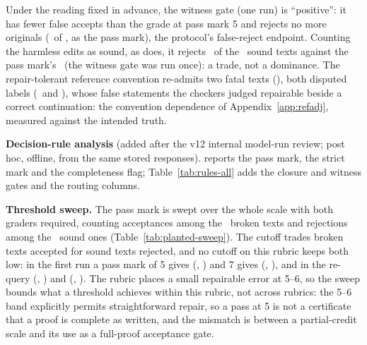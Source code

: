 Under the reading fixed in advance, the witness gate (one run) is ``positive'': it has fewer false accepts than the grade at pass mark 5 and rejects no more originals (\CRWitnessORejP\ of \CRNPerClass, as the pass mark), the protocol's false-reject endpoint. Counting the harmless edits as sound, as  does, it rejects \CRWitnessSoundRejP\ of the \CRNSound\ sound texts against the pass mark's \CRPassSoundRejP\ (the witness gate was run once): a trade, not a dominance. The repair-tolerant reference convention re-admits two fatal texts (\PLANTFAREFADJWIT), both disputed labels (\CRIdKimiPoneF\ and \CRIdGptPfiveF), whose false statements the checkers judged repairable beside a correct continuation: the convention dependence of Appendix~\ref{app:refadj}, measured against the intended truth.

\textbf{Decision-rule analysis} (added after the v12 internal model-run review; post hoc, offline, from the same stored responses).  reports the pass mark, the strict mark and the completeness flag; Table~\ref{tab:rules-all} adds the closure and witness gates and the routing columns.

\textbf{Threshold sweep.} The pass mark is swept over the whole scale with both graders required, counting acceptances among the \CRNBroken\ broken texts and rejections among the \CRNSound\ sound ones (Table~\ref{tab:planted-sweep}). The cutoff trades broken texts accepted for sound texts rejected, and no cutoff on this rubric keeps both low: in the first run a pass mark of 5 gives (\CRSweepFiveBrokenP, \CRSweepFiveSoundP) and 7 gives (\CRSweepSevenBrokenP, \CRSweepSevenSoundP), and in the re-query (\CRSweepFiveBrokenR, \CRSweepFiveSoundR) and (\CRSweepSevenBrokenR, \CRSweepSevenSoundR). The rubric places a small repairable error at 5--6, so the sweep bounds what a threshold achieves within this rubric, not across rubrics: the 5--6 band explicitly permits straightforward repair, so a pass at 5 is not a certificate that a proof is complete as written, and the mismatch is between a partial-credit scale and its use as a full-proof acceptance gate.

